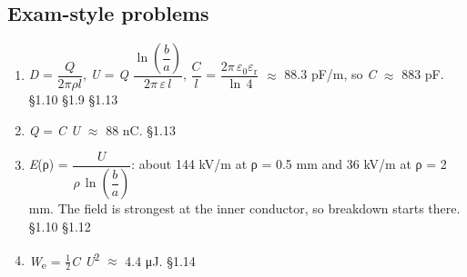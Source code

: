 \documentclass[11pt]{article}
\begin{document}
\begin{keepsection}\subsection{Exam-style problems}

\begin{enumerate}
\item \textit{D} = {\small\ensuremath{\dfrac{{Q}}{2πρ{l}}}}, \textit{U} = \textit{Q} {\small\ensuremath{\dfrac{\ln (\dfrac{{b}}{{a}})}{2π\, ε\, {l}}}}, {\small\ensuremath{\dfrac{{C}}{{l}}}} = {\small\ensuremath{\dfrac{2π\, ε_{0}ε_{\mathrm{r}}}{\ln \, 4}}} \ensuremath{\approx} 88.3 pF/m, so \textit{C} \ensuremath{\approx} 883 pF. \hfill{\small\color{FAUblue}§1.10} \hfill{\small\color{FAUblue}§1.9} \hfill{\small\color{FAUblue}§1.13}
\item \textit{Q} = \textit{C U} \ensuremath{\approx} 88 nC. \hfill{\small\color{FAUblue}§1.13}
\item \textit{E}(ρ) = {\small\ensuremath{\dfrac{{U}}{ρ\, \ln (\dfrac{{b}}{{a}})}}}: about 144 kV/m at ρ = 0.5 mm and 36 kV/m at ρ = 2 mm. The field is strongest at the inner conductor, so breakdown starts there. \hfill{\small\color{FAUblue}§1.10} \hfill{\small\color{FAUblue}§1.12}
\item \textit{W}\textsubscript{e} = \ensuremath{\tfrac12}\textit{C U}\textsuperscript{2} \ensuremath{\approx} 4.4 μJ. \hfill{\small\color{FAUblue}§1.14}
\end{enumerate}

\end{keepsection}
\end{document}
